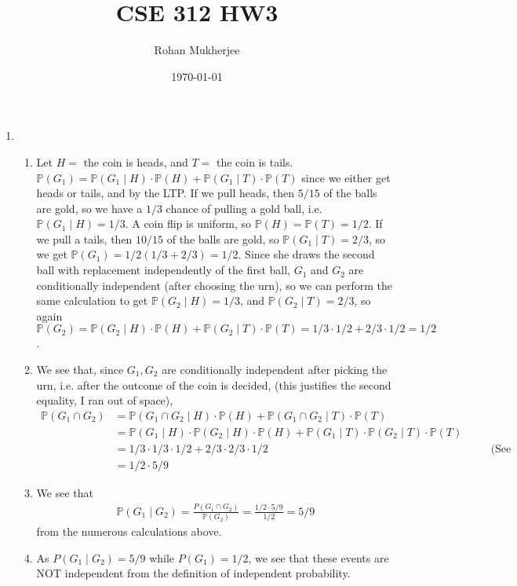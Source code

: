 \documentclass[12pt]{article}
\title{CSE 312 HW3}
\date{\today}
\author{Rohan Mukherjee}
\theoremstyle{definition}
\theoremstyle{remark}
\renewcommand{\P}{\mathbb{P}}
\newcommand{\justif}[1]{&\quad &\text{(#1)}}
\begin{document}
	\maketitle
	\begin{enumerate}[leftmargin=\labelsep]
		\item \begin{enumerate}
			\item Let $H=$ the coin is heads, and $T =$ the coin is tails. $\P(G_1) = \P(G_1 \mid H)\cdot \P(H) + \P(G_1 \mid T) \cdot \P(T)$ since we either get heads or tails, and by the LTP. If we pull heads, then $5/15$ of the balls are gold, so we have a $1/3$ chance of pulling a gold ball, i.e. $\P(G_1 \mid H) = 1/3$. A coin flip is uniform, so $\P(H) = \P(T) = 1/2$. If we pull a tails, then $10/15$ of the balls are gold, so $\P(G_1 \mid T) = 2/3$, so we get $\P(G_1) = 1/2 (1/3 + 2/3) = 1/2$. Since she draws the second ball with replacement independently of the first ball, $G_1$ and $G_2$ are conditionally independent (after choosing the urn), so we can perform the same calculation to get $\P(G_2 \mid H) = 1/3$, and $\P(G_2 \mid T) = 2/3$, so again $\P(G_2) = \P(G_2 \mid H) \cdot \P(H) + \P(G_2 \mid T) \cdot \P(T) = 1/3 \cdot 1/2 + 2/3 \cdot 1/2 = 1/2$.
			\item We see that, since $G_1, G_2$ are conditionally independent after picking the urn, i.e. after the outcome of the coin is decided, (this justifies the second equality, I ran out of space),
			\begin{align*}
				\P(G_1 \cap G_2) &= \P(G_1 \cap G_2 \mid H) \cdot \P(H) + \P(G_1 \cap G_2 \mid T) \cdot \P(T) \\
				&= \P(G_1 \mid H) \cdot \P(G_2 \mid H) \cdot \P(H) + \P(G_1 \mid T) \cdot \P(G_2 \mid T) \cdot \P(T) \\
				&= 1/3 \cdot 1/3 \cdot 1/2 + 2/3 \cdot 2/3 \cdot 1/2 \justif{See part (a)} \\
				&= 1/2 \cdot 5/9
			\end{align*}
		
			\item We see that
			\begin{align*}
				\P(G_1 \mid G_2) = \frac{P(G_1 \cap G_2)}{\P(G_2)} = \frac{1/2 \cdot 5/9}{1/2} = 5/9
			\end{align*}
			from the numerous calculations above.
			
			\item As $P(G_1 \mid G_2) = 5/9$ while $P(G_1) = 1/2$, we see that these events are NOT independent from the definition of independent probability.
			

\end{enumerate}
\end{enumerate}
\end{document}

